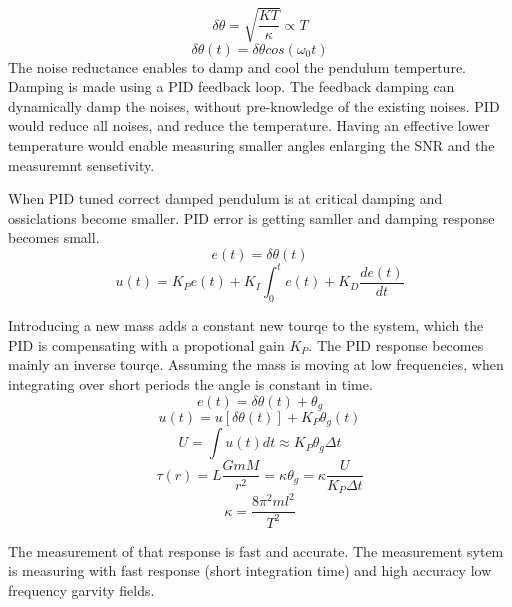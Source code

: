 \documentclass[\main/master.tex]{subfiles}
\begin{document}
\begin{equation}
\delta\theta = \sqrt{\frac{KT}{\kappa}}\propto{T}  \label{eqn:radiation force}
\end{equation}
\begin{equation}
\delta\theta(t) = \delta\theta cos(\omega_0 t)   \label{eqn:pid_error}
\end{equation}
The noise reductance enables to damp and cool the pendulum temperture. Damping is made using a PID feedback loop. The feedback damping can dynamically damp the noises, without pre-knowledge of the existing noises. PID would reduce all noises, and reduce the temperature. Having an effective lower temperature would enable measuring smaller angles enlarging the SNR and the measuremnt sensetivity.
\par
When PID tuned correct damped pendulum is at critical damping and ossiclations become smaller. PID error is getting samller and damping response becomes small. 
\begin{equation}
e(t) = \delta\theta(t)   \label{eqn:pid_error}
\end{equation}
\begin{equation}
u(t) = K_Pe(t)+K_I\int_{0}^{t}e(t)+K_D\frac{de(t)}{dt}   \label{eqn:PID_eq}
\end{equation}

Introducing a new mass adds a constant new tourqe to the system, which the PID is compensating with a propotional gain $K_P$. The PID response becomes mainly an inverse tourqe. Assuming the mass is moving at low frequencies, when integrating over short periods the angle is constant in time.
\begin{equation}
e(t) = \delta\theta(t) + \theta_g    \label{eqn:PID_measurement}
\end{equation}
\begin{equation}
u(t) = u[ \delta\theta(t)] + K_P\theta_g(t) \label{eqn:PID_measurement_eq}
\end{equation}
\begin{equation}
U = \int u(t)dt  \approx K_P\theta_g\Delta t \label{eqn:PID_measurement_eq}
\end{equation}
\begin{equation}
\tau(r) = L\frac{GmM}{r^2} =  \kappa\theta_g = \kappa\frac{U}{K_P\Delta t}      \label{eqn:pid_gravitation_tourqe}
\end{equation}
\begin{equation}
\kappa =\frac{8\pi^2ml^2}{T^2}    \label{eqn:empirical_tourqe}
\end{equation}

The measurement of that response is fast and accurate. The measurement sytem is measuring with fast response (short integration time) and high accuracy low frequency garvity fields. 

 
 
 
 
\end{document}

